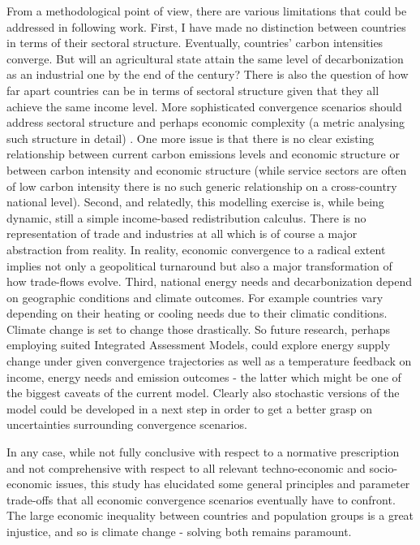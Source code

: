 \documentclass{article}
\begin{document}
From a methodological point of view, there are various limitations that could be addressed in following work. First, I have made no distinction between countries in terms of their sectoral structure. Eventually, countries' carbon intensities converge. But will an agricultural state attain the same level of decarbonization as an industrial one by the end of the century? There is also the question of how far apart countries can be in terms of sectoral structure given that they all achieve the same income level. More sophisticated convergence scenarios should address sectoral structure and perhaps economic complexity (a metric analysing such structure in detail) \parencite{hidalgo2021economic}. One more issue is that there is no clear existing relationship between current carbon emissions levels and economic structure or between carbon intensity and economic structure (while service sectors are often of low carbon intensity there is no such generic relationship on a cross-country national level). %
Second, and relatedly, this modelling exercise is, while being dynamic, still a simple income-based redistribution calculus. There is no representation of trade and industries at all which is of course a major abstraction from reality. In reality, economic convergence to a radical extent implies not only a geopolitical turnaround but also a major transformation of how trade-flows evolve. Third, national energy needs and decarbonization depend on geographic conditions and climate outcomes. For example countries vary depending on their heating or cooling needs due to their climatic conditions. Climate change is set to change those drastically. So future research, perhaps employing suited Integrated Assessment Models, could explore energy supply change under given convergence trajectories as well as a temperature feedback on income, energy needs and emission outcomes \parencite{kikstra2021social} - the latter which might be one of the biggest caveats of the current model. Clearly also stochastic versions of the model could be developed in a next step in order to get a better grasp on uncertainties surrounding convergence scenarios.

In any case, while not fully conclusive with respect to a normative prescription and not comprehensive with respect to all relevant techno-economic and socio-economic issues, this study has elucidated some general principles and parameter trade-offs that all economic convergence scenarios eventually have to confront. The large economic inequality between countries and population groups is a great injustice, and so is climate change - solving both remains paramount.
\end{document}
